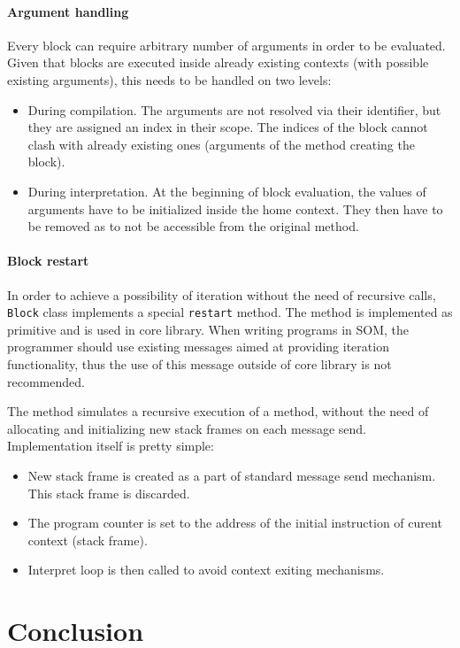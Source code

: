 \documentclass[thesis=M,english]{FITthesis}[2019/12/23]
\begin{document}
\subsubsection{Argument handling}
Every block can require arbitrary number of arguments in order to be evaluated. Given that blocks are executed inside already existing
contexts (with possible existing arguments), this needs to be handled on two levels:
\begin{itemize}
	\item During compilation. The arguments are not resolved via their identifier, but they are assigned an index in their scope.
		The indices of the block cannot clash with already existing ones (arguments of the method creating the block).
	\item During interpretation. At the beginning of block evaluation, the values of arguments have to be initialized inside the home context.
		They then have to be removed as to not be accessible from the original method.
\end{itemize}

\subsubsection{Block restart}
In order to achieve a possibility of iteration without the need of recursive calls, \texttt{Block} class implements a special \texttt{restart} method.
The method is implemented as primitive and is used in core library. When writing programs in SOM, the programmer should use existing messages aimed at
providing iteration functionality, thus the use of this message outside of core library is not recommended.

The method simulates a recursive execution of a method, without the need of allocating and initializing new stack frames on each message send.
Implementation itself is pretty simple:
\begin{itemize}
	\item New stack frame is created as a part of standard message send mechanism. This stack frame is discarded.
	\item The program counter is set to the address of the initial instruction of curent context (stack frame).
	\item Interpret loop is then called to avoid context exiting mechanisms.
\end{itemize}

\chapter{Conclusion}
\end{document}
